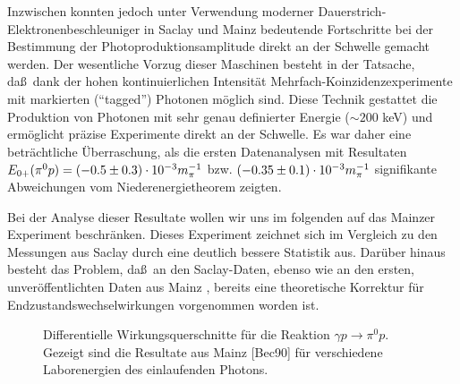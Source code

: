 Inzwischen konnten jedoch unter Verwendung moderner 
Dau\-er\-strich-Elek\-tro\-nen\-be\-schleu\-niger in Saclay \cite{Maz86} und
Mainz \cite{Bec90} bedeutende Fortschritte bei der Bestimmung der
Photoproduktionsamplitude direkt an der Schwelle gemacht werden. 
Der wesentliche Vorzug dieser Maschinen besteht in der Tatsache, 
da\ss\ dank der hohen kontinuierlichen Intensit\"at
Mehrfach-Koinzidenzexperimente mit markierten (``tagged'')
Photonen m\"oglich sind. Diese Technik gestattet die Produktion von
Photonen mit sehr genau definierter Energie ($\sim 200$ keV) und 
erm\"oglicht pr\"azise Experimente direkt an der Schwelle. 
Es war daher eine betr\"achtliche \"Uberraschung, als die ersten 
Datenanalysen mit Resultaten $E_{0+}(\pi^0 p) = (-0.5\pm 0.3) \cdot 10^{-3} m_\pi^{-1}$ \cite{Maz86}
bzw. $(-0.35 \pm 0.1) \cdot 10^{-3} m_\pi^{-1}$ \cite{Bec89} signifikante Abweichungen
vom Niederenergietheorem zeigten. 

Bei der Analyse dieser Resultate wollen wir uns im folgenden auf 
das Mainzer Experiment \cite{Bec90,Str90} beschr\"anken. Dieses Experiment 
zeichnet sich im Vergleich zu den Messungen aus Saclay durch eine deutlich 
bessere Statistik aus. Dar\"uber hinaus besteht das Problem,
da\ss\ an den Saclay-Daten, ebenso wie an den ersten, unver\"offentlichten 
Daten aus Mainz \cite{Bec89}, bereits eine theoretische Korrektur f\"ur 
Endzustandswechselwirkungen vorgenommen worden ist.
\begin{figure}
\caption{Differentielle Wirkungsquerschnitte f\"ur die Reaktion
$\gamma p\to \pi^0 p$. Gezeigt sind die Resultate aus Mainz
[Bec90] f\"ur verschiedene Laborenergien des einlaufenden
Photons.}
\vspace{20cm}
\end{figure}

